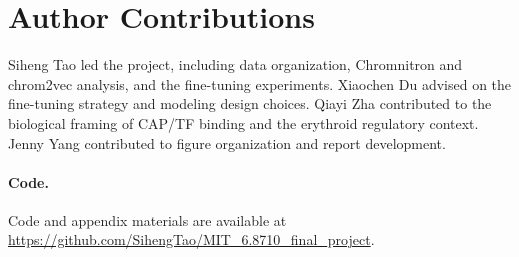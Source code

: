 \documentclass[nohyperref]{article}
\begin{document}
\section*{Author Contributions}

Siheng Tao led the project, including data organization, Chromnitron and chrom2vec analysis, and the fine-tuning experiments. Xiaochen Du advised on the fine-tuning strategy and modeling design choices. Qiayi Zha contributed to the biological framing of CAP/TF binding and the erythroid regulatory context. Jenny Yang contributed to figure organization and report development.

\paragraph{Code.} Code and appendix materials are available at \url{https://github.com/SihengTao/MIT_6.8710_final_project}.

\nocite{tan2025chromnitron,buenrostro2013atacseq,johnson2007chipseq,zhou2015deepsea,kelley2018basenji,avsec2021enformer,avsec2021bpnet,cazares2023maxatac,huang2022hic2,bauer2013bcl11a,canver2015bcl11a,hu2022lora}


\end{document}
